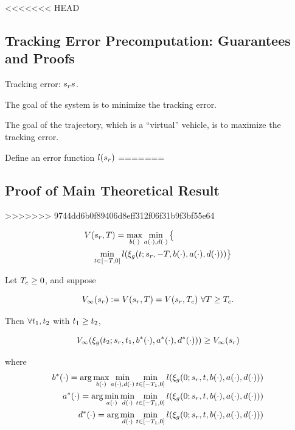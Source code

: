 <<<<<<< HEAD
 \subsection{Tracking Error Precomputation: Guarantees and Proofs}
 
 Tracking error: $s_rs$.
 
 The goal of the system is to minimize the tracking error.
 
 The goal of the trajectory, which is a ``virtual'' vehicle, is to maximize the tracking error.
 
 Define an error function $l(s_r)$
=======
 \subsection{Proof of Main Theoretical Result}
>>>>>>> 9744dd6b0f89406d8eff312f06f31b9f3bf55e64
 
 \begin{equation}
 \begin{aligned}
& V(s_r, T) = \max_{b(\cdot)} \min_{a(\cdot), d(\cdot)} \big\{\\
&\quad \min_{t \in [-T, 0]} l(\xi_g(t; s_r, -T, b(\cdot), a(\cdot), d(\cdot)))\big\} 
 \end{aligned}
  \end{equation}
 
 \begin{thm}
   Let $T_c \ge 0$, and suppose
   
   \begin{equation}
   \label{eq:conv_valfunc}
   V_\infty(s_r) := V(s_r, T) = V(s_r, T_c) ~ \forall T \ge T_c.
   \end{equation}
   
   Then $\forall t_1, t_2$ with $t_1 \ge t_2$,
   
   \begin{equation}
   V_\infty(\xi_g(t_2; s_r, t_1, b^*(\cdot), a^*(\cdot), d^*(\cdot))) \ge V_\infty(s_r)
   \end{equation}
   
   \noindent where
   \begin{equation}
   \begin{aligned}
   b^*(\cdot) = \arg \max_{b(\cdot)} \min_{a(\cdot), d(\cdot)} \min_{t \in [-T_1, 0]} l(\xi_g(0; s_r, t, b(\cdot), a(\cdot), d(\cdot))) \\
   a^*(\cdot) = \arg \min_{a(\cdot)} \min_{d(\cdot)} \min_{t \in [-T_1, 0]} l(\xi_g(0; s_r, t, b(\cdot), a(\cdot), d(\cdot))) \\
   d^*(\cdot) = \arg \min_{d(\cdot)} \min_{t \in [-T_1, 0]} l(\xi_g(0; s_r, t, b(\cdot), a(\cdot), d(\cdot))) 
   \end{aligned}
   \end{equation}
   
 \end{thm}
 

